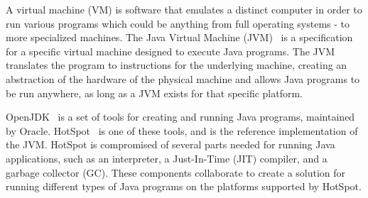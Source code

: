 A virtual machine (VM) is software that emulates a distinct computer in order to run various programs which could be anything from full operating systems - to more specialized machines. The Java Virtual Machine (JVM)~\cite{JVM} is a specification for a specific virtual machine designed to execute Java programs. The JVM translates the program to instructions for the underlying machine, creating an abstraction of the hardware of the physical machine and allows Java programs to be run anywhere, as long as a JVM exists for that specific platform. 

OpenJDK~\cite{openjdk} is a set of tools for creating and running Java programs, maintained by Oracle. HotSpot~\cite{hotspot} is one of these tools, and is the reference implementation of the JVM. HotSpot is compromised of several parts needed for running Java applications, such as an interpreter, a Just-In-Time (JIT) compiler, and a garbage collector (GC). These components collaborate to create a solution for running different types of Java programs on the platforms supported by HotSpot.


